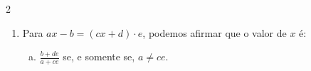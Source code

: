 \documentclass[a4paper,14pt]{article}
\begin{document}
\begin{multicols}{2}
\begin{enumerate}
\begin{enumerate}[a)]
				\item $-\bigg(6x + 3 - \frac{-2x - 1}{9}\bigg) + x = 0$ \\\\\\\\\\\\\\\\\\\\\\\\\\\\\\\\\\\\\\\\\\\\\\\\\\
				\item $-3 + \frac{x - 1}{\frac{3}{8}} - x = \frac{1}{4} \cdot \frac{-x - 7}{\frac{5}{6}}$ \\\\\\\\\\\\\\\\\\\\\\\\\\\\\\\\\\\\\\\\\\\\\\\\\\
			\end{enumerate}
			\item Para $ax - b = (cx + d) \cdot e$, podemos afirmar que o valor de $x$ é:
			\begin{enumerate}[a)]
				\item \small $\frac{b + de}{a + ce}$ se, e somente se, $a \neq ce$.

\end{enumerate}
\end{enumerate}
\end{multicols}
\end{document}
